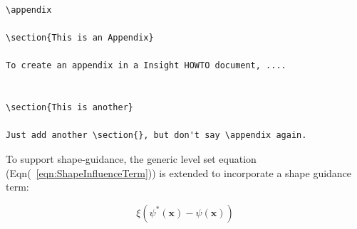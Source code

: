 \documentclass{InsightArticle}
\begin{document}
\begin{verbatim}
\appendix

\section{This is an Appendix}

To create an appendix in a Insight HOWTO document, ....


\section{This is another}

Just add another \section{}, but don't say \appendix again.
\end{verbatim}



%
%


To support shape-guidance, the generic level set equation
(Eqn(~\ref{eqn:ShapeInfluenceTerm})) is extended to incorporate a shape guidance
term:

\begin{equation}
\label{eqn:ShapeInfluenceTerm}
\xi \left(\psi^{*}(\mathbf{x}) - \psi(\mathbf{x})\right)
\end{equation}




%
%



\end{document}
